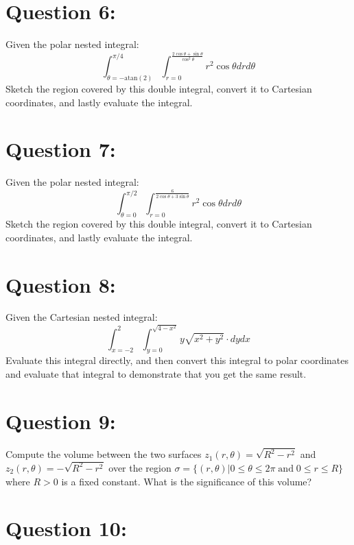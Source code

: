 \documentclass{article}
\newcommand{\atan}{\text{atan}}
\begin{document}
\section*{Question 6:}

Given the polar nested integral:
\[\int_{\theta = -\atan(2)}^{\pi/4}\int_{r = 0}^{\frac{2\cos\theta + \sin\theta}{\cos^2\theta}} r^2\cos\theta dr d\theta\]
Sketch the region covered by this double integral, convert it to Cartesian coordinates, and lastly evaluate the integral.



\section*{Question 7:}

Given the polar nested integral:
\[\int_{\theta = 0}^{\pi/2}\int_{r = 0}^{\frac{6}{2\cos\theta + 3\sin\theta}} r^2\cos\theta dr d\theta\]
Sketch the region covered by this double integral, convert it to Cartesian coordinates, and lastly evaluate the integral.



\section*{Question 8:}

Given the Cartesian nested integral:
\[\int_{x = -2}^2 \int_{y = 0}^{\sqrt{4-x^2}} y\sqrt{x^2 + y^2} \cdot dydx\]
Evaluate this integral directly, and then convert this integral to polar coordinates and evaluate that integral to demonstrate that you get the same result.



\section*{Question 9:}

Compute the volume between the two surfaces \(z_1(r,\theta) = \sqrt{R^2 - r^2}\) and \(z_2(r,\theta) = -\sqrt{R^2 - r^2}\) over the region \(\sigma = \{(r,\theta)|0 \leq \theta \leq 2\pi \;\text{and}\; 0 \leq r \leq R\}\) where \(R > 0\) is a fixed constant. What is the significance of this volume?



\section*{Question 10:}
\end{document}
